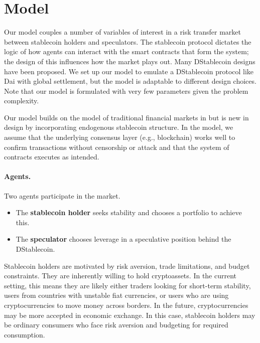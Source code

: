 \section{Model}\label{sec:model}

Our model couples a number of variables of interest in a risk transfer market between stablecoin holders and speculators. The stablecoin protocol dictates the logic of how agents can interact with the smart contracts that form the system; the design of this influences how the market plays out. Many DStablecoin designs have been proposed. We set up our model to emulate a DStablecoin protocol like Dai with global settlement, but the model is adaptable to different design choices. Note that our model is formulated with very few parameters given the problem complexity.

Our model builds on the model of traditional financial markets in \cite{farmer2015} but is new in design by incorporating endogenous stablecoin structure. In the model, we assume that the underlying consensus layer (e.g., blockchain) works well to confirm transactions without censorship or attack and that the system of contracts executes as intended.





\paragraph{Agents.} Two agents participate in the market.
\begin{itemize}
	\item The \textbf{stablecoin holder} seeks stability and chooses a portfolio to achieve this.
	\item The \textbf{speculator} chooses leverage in a speculative position behind the DStablecoin.
\end{itemize}


Stablecoin holders are motivated by risk aversion, trade limitations, and budget constraints. They are inherently willing to hold cryptoassets. In the current setting, this means they are likely either traders looking for short-term stability, users from countries with unstable fiat currencies, or users who are using cryptocurrencies to move money across borders. In the future, cryptocurrencies may be more accepted in economic exchange. In this case, stablecoin holders may be ordinary consumers who face risk aversion and budgeting for required consumption.

